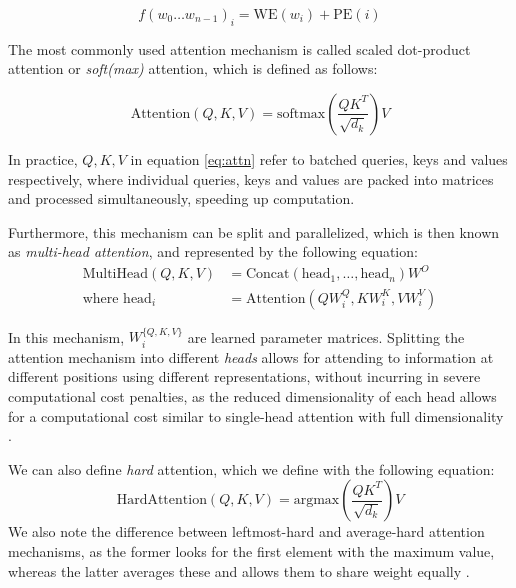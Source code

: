 \begin{equation}
    f(w_0\dots w_{n-1})_i = \text{WE}(w_i) +\text{PE}(i)
\end{equation}

The most commonly used attention mechanism is called scaled dot-product attention or \emph{soft(max)} attention, which is defined as follows:

\begin{equation} \label{eq:attn}
    \text{Attention}(Q, K, V) = \text{softmax}\left( \frac{QK^T}{\sqrt{d_k}} \right)V
\end{equation}

In practice, $Q, K, V$ in equation \ref{eq:attn} refer to batched queries, keys and values respectively, where individual queries, keys and values are packed into matrices and processed simultaneously, speeding up computation.

Furthermore, this mechanism can be split and parallelized, which is then known as \emph{multi-head attention}, and represented by the following equation:
\begin{equation} \label{eq:multihead-attn}
    \begin{split}
        \text{MultiHead}(Q, K, V) &= \text{Concat}(\text{head}_1, \dots, \text{head}_n)W^O \\
        \text{where head}_i &= \text{Attention}(QW_{i}^{Q}, KW_{i}^K, VW_{i}^V)
    \end{split}
\end{equation}

In this mechanism, $W_{i}^{\{Q, K, V\}}$ are learned parameter matrices. Splitting the attention mechanism into different \emph{heads} allows for attending to information at different positions using different representations, without incurring in severe computational cost penalties, as the reduced dimensionality of each head allows for a computational cost similar to single-head attention with full dimensionality \cite{attention_is_all_you_need}.

We can also define \emph{hard} attention, which we define with the following equation:
\begin{equation}
    \text{HardAttention}(Q, K, V) = \text{argmax}\left( \frac{QK^T}{\sqrt{d_k}}\right)V
\end{equation}
We also note the difference between leftmost-hard and average-hard attention mechanisms, as the former looks for the first element with the maximum value, whereas the latter averages these and allows them to share weight equally \cite{strobl2024formal}.


